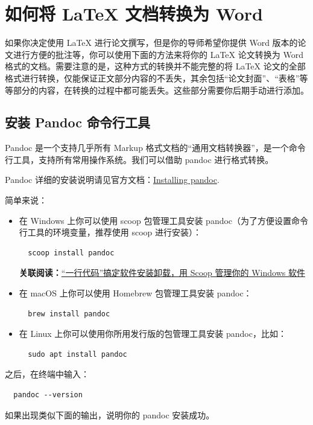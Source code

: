 \section{如何将 {\LaTeX} 文档转换为 Word}

如果你决定使用 {\LaTeX} 进行论文撰写，但是你的导师希望你提供 Word 版本的论文进行方便的批注等，你可以使用下面的方法来将你的 {\LaTeX} 论文转换为 Word 格式的文档。需要注意的是，这种方式的转换并不能完整的将 {\LaTeX} 论文的全部格式进行转换，仅能保证正文部分内容的不丢失，其余包括“论文封面”、“表格”等等部分的内容，在转换的过程中都可能丢失。这些部分需要你后期手动进行添加。

\subsection{安装 Pandoc 命令行工具}

Pandoc 是一个支持几乎所有 Markup 格式文档的“通用文档转换器”，是一个命令行工具，支持所有常用操作系统。我们可以借助 pandoc 进行格式转换。

Pandoc 详细的安装说明请见官方文档：\href{https://pandoc.org/installing.html}{Installing pandoc}.

简单来说：

\begin{itemize}
  \item 在 Windows 上你可以使用 scoop 包管理工具安装 pandoc（为了方便设置命令行工具的环境变量，推荐使用 scoop 进行安装）：
  \begin{verbatim}
  scoop install pandoc
  \end{verbatim}
  \textbf{关联阅读：}\href{https://sspai.com/post/52496}{“一行代码”搞定软件安装卸载，用 Scoop 管理你的 Windows 软件}
  \item 在 macOS 上你可以使用 Homebrew 包管理工具安装 pandoc：
  \begin{verbatim}
  brew install pandoc
  \end{verbatim}
  \item 在 Linux 上你可以使用你所用发行版的包管理工具安装 pandoc，比如：
  \begin{verbatim}
  sudo apt install pandoc
  \end{verbatim}
\end{itemize}

之后，在终端中输入：
\begin{verbatim}
  pandoc --version
\end{verbatim}

如果出现类似下面的输出，说明你的 pandoc 安装成功。

